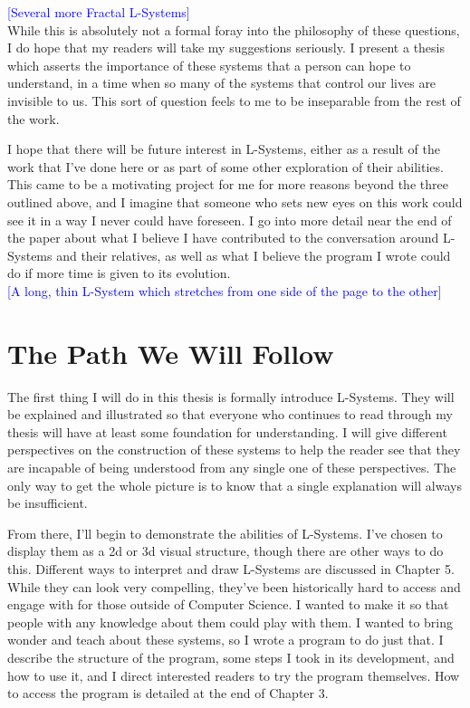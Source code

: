 \documentclass[12pt,twoside]{reedthesis}
\begin{document}
	\textcolor{blue}{[Several more Fractal L-Systems]}\\
	
	While this is absolutely not a formal foray into the philosophy of these questions, I do hope that my readers will take my suggestions seriously. I present a thesis which asserts the importance of these systems that a person can hope to understand, in a time when so many of the systems that control our lives are invisible to us. This sort of question feels to me to be inseparable from the rest of the work.
	
	I hope that there will be future interest in L-Systems, either as a result of the work that I’ve done here or as part of some other exploration of their abilities. This came to be a motivating project for me for more reasons beyond the three outlined above, and I imagine that someone who sets new eyes on this work could see it in a way I never could have foreseen. I go into more detail near the end of the paper about what I believe I have contributed to the conversation around L-Systems and their relatives, as well as what I believe the program I wrote could do if more time is given to its evolution.\\
	
	\textcolor{blue}{[A long, thin L-System which stretches from one side of the page to the other]}
	
\section{The Path We Will Follow}

	The first thing I will do in this thesis is formally introduce L-Systems. They will be explained and illustrated so that everyone who continues to read through my thesis will have at least some foundation for understanding. I will give different perspectives on the construction of these systems to help the reader see that they are incapable of being understood from any single one of these perspectives. The only way to get the whole picture is to know that a single explanation will always be insufficient.
	
	From there, I'll begin to demonstrate the abilities of L-Systems. I've chosen to display them as a 2d or 3d visual structure, though there are other ways to do this. Different ways to interpret and draw L-Systems are discussed in Chapter 5. While they can look very compelling, they've been historically hard to access and engage with for those outside of Computer Science. I wanted to make it so that people with any knowledge about them could play with them. I wanted to bring wonder and teach about these systems, so I wrote a program to do just that. I describe the structure of the program, some steps I took in its development, and how to use it, and I direct interested readers to try the program themselves. How to access the program is detailed at the end of Chapter 3.\\
	
\end{document}
